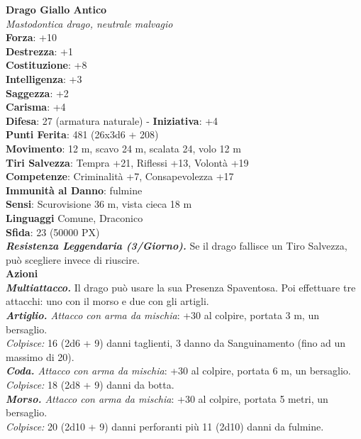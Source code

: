 \begin{multicols}{2}
\medskip\textbf{Drago Giallo Antico}\\
\textit{Mastodontica drago, neutrale malvagio}\\
\textbf{Forza}: +10\\
\textbf{Destrezza}: +1\\
\textbf{Costituzione}: +8\\
\textbf{Intelligenza}: +3\\
\textbf{Saggezza}: +2\\
\textbf{Carisma}: +4\\
\textbf{Difesa}: 27 (armatura naturale) - \textbf{Iniziativa}: +4\\
\textbf{Punti Ferita}: 481 (26x3d6 + 208)\\
\textbf{Movimento}: 12 m, scavo 24 m, scalata 24, volo 12 m\\
\textbf{Tiri Salvezza}: Tempra +21, Riflessi +13, Volontà +19\\
\textbf{Competenze}: Criminalità +7, Consapevolezza +17\\
\textbf{Immunità al Danno}: fulmine\\
\textbf{Sensi}: Scurovisione 36 m, vista cieca 18 m\\
\textbf{Linguaggi} Comune, Draconico\\
\textbf{Sfida}: 23 (50000 PX)\smallskip\\
\textit{\textbf{Resistenza Leggendaria (3/Giorno).}} Se il drago fallisce un Tiro Salvezza, può scegliere invece di riuscire. \\
\smallskip\textbf{Azioni}\\
\textit{\textbf{Multiattacco.}} Il drago può usare la sua Presenza Spaventosa. Poi effettuare tre attacchi: uno con il morso e due con gli artigli.\\
\textit{\textbf{Artiglio.} Attacco con arma da mischia}: +30 al colpire, portata 3 m, un bersaglio.\\
\textit{Colpisce:} 16 (2d6 + 9) danni taglienti, 3 danno da Sanguinamento (fino ad un massimo di 20).\\
\textit{\textbf{Coda.} Attacco con arma da mischia}: +30 al colpire, portata 6 m, un bersaglio.\\
\textit{Colpisce:} 18 (2d8 + 9) danni da botta.\\
\textit{\textbf{Morso.} Attacco con arma da mischia}: +30 al colpire, portata 5 metri, un bersaglio.\\
\textit{Colpisce:} 20 (2d10 + 9) danni perforanti più 11 (2d10) danni da fulmine.\\

\end{multicols}
